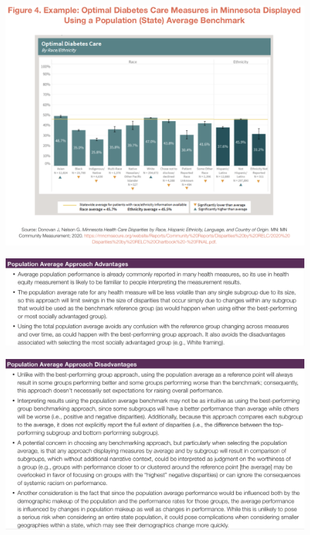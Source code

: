\documentclass[14pt]{extarticle}
\begin{document}
\begin{figure}[H]
    \centering
    \includegraphics[width=1\textwidth]{fig15.png}
\end{figure}
\newpage
\begin{figure}[H]
    \centering
    \includegraphics[width=1\textwidth]{fig16.png}
\end{figure}
\begin{figure}[H]
    \centering
    \includegraphics[width=1\textwidth]{fig17.png}
\end{figure}
\end{document}
